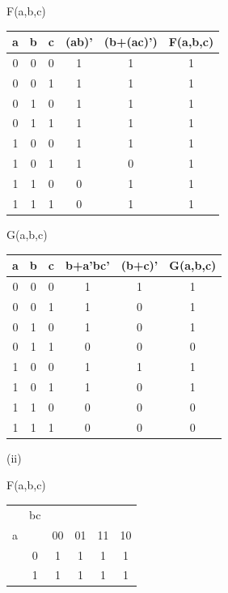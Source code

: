 \documentclass{article}
\begin{document}
    \quad\quad\quad F(a,b,c)
    \begin{center}
        \begin{tabular} {ccc|c|c|c} 
            a & b & c & (ab)' & (b+(ac)') & F(a,b,c) \\
            \hline
            0 & 0 & 0 & 1 & 1 & 1 \\
            0 & 0 & 1 & 1 & 1 & 1 \\
            0 & 1 & 0 & 1 & 1 & 1 \\
            0 & 1 & 1 & 1 & 1 & 1 \\
            1 & 0 & 0 & 1 & 1 & 1 \\
            1 & 0 & 1 & 1 & 0 & 1 \\
            1 & 1 & 0 & 0 & 1 & 1 \\
            1 & 1 & 1 & 0 & 1 & 1 \\
        \end{tabular}
    \end{center}
    \quad\quad\quad G(a,b,c)
    \begin{center}
        \begin{tabular} {ccc|c|c|c} 
            a & b & c & b+a'bc' & (b+c)' & G(a,b,c) \\
            \hline
            0 & 0 & 0 & 1 & 1 & 1 \\
            0 & 0 & 1 & 1 & 0 & 1 \\
            0 & 1 & 0 & 1 & 0 & 1 \\
            0 & 1 & 1 & 0 & 0 & 0 \\
            1 & 0 & 0 & 1 & 1 & 1 \\
            1 & 0 & 1 & 1 & 0 & 1 \\
            1 & 1 & 0 & 0 & 0 & 0 \\
            1 & 1 & 1 & 0 & 0 & 0 \\
        \end{tabular}
    \end{center}

    \quad\quad (ii)

    \quad\quad\quad F(a,b,c)

    \begin{center}
        \begin{tabular} {cc|cccc}
            & bc & &&& \\
            a && 00 & 01 & 11 & 10 \\
            \hline
            & 0 & 1 & 1 & 1 & 1 \\
            & 1 & 1 & 1 & 1 & 1 \\
        \end{tabular}
    \end{center}
\end{document}
